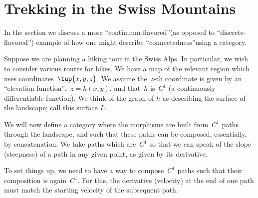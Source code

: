 
\section{Trekking in the Swiss Mountains}
\label{sec:trekking}

In the section we discuss a more ``continuum-flavored''(as opposed to ``discrete-flavored'') example of how one might describe ``connectedness''using a category.

Suppose we are planning a hiking tour in the Swiss Alps.
In particular, we wish to consider various routes for hikes.
We have a map of the relevant region which uses coordinates~$\tup{x,y,z}$.
We assume the~$z$-th coordinate is given by an ``elevation function'',~$z = h(x,y)$, and that~$h$ is~$C^1$ (a continuously differentiable function).
We think of the graph of $h$ as describing the surface of the landscape; call this surface $L$.

We will now define a category where the morphisms are built from~$C^1$ paths through the landscape, and such that these paths can be composed, essentially, by concatenation.
We take paths which are~$C^1$ so that we can speak of the slope (steepness) of a path in any given point, as given by its derivative.

To set things up, we need to have a way to compose~$C^1$ paths such that their composition is again~$C^1$.
For this, the derivative (velocity) at the end of one path must match the starting velocity of the subsequent path.

